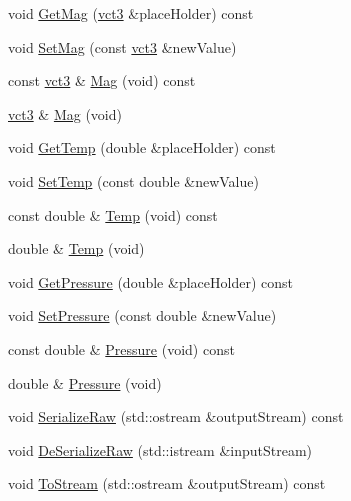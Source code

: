 \begin{DoxyCompactItemize}
\item 
void \hyperlink{classprm_i_m_u_sensors_a2b411076ee5ad07a1efc0579f155b439}{Get\+Mag} (\hyperlink{vct_fixed_size_vector_types_8h_a3af82acdbf4eeb73c551909240b106ea}{vct3} \&place\+Holder) const 
\item 
void \hyperlink{classprm_i_m_u_sensors_a32caeecddd4645cf66e262cb3616f471}{Set\+Mag} (const \hyperlink{vct_fixed_size_vector_types_8h_a3af82acdbf4eeb73c551909240b106ea}{vct3} \&new\+Value)
\item 
const \hyperlink{vct_fixed_size_vector_types_8h_a3af82acdbf4eeb73c551909240b106ea}{vct3} \& \hyperlink{classprm_i_m_u_sensors_a5953c853628f80037e25aa74cb838f6c}{Mag} (void) const 
\item 
\hyperlink{vct_fixed_size_vector_types_8h_a3af82acdbf4eeb73c551909240b106ea}{vct3} \& \hyperlink{classprm_i_m_u_sensors_ae8bd56f3961cd7474362fb7fe71bf3a1}{Mag} (void)
\item 
void \hyperlink{classprm_i_m_u_sensors_a5ad8f54818693ea340ed9588b78b4b2a}{Get\+Temp} (double \&place\+Holder) const 
\item 
void \hyperlink{classprm_i_m_u_sensors_a50d32b5dc243c0ebc92f74897fcc003b}{Set\+Temp} (const double \&new\+Value)
\item 
const double \& \hyperlink{classprm_i_m_u_sensors_acef6ba2cba7affc1c9a4ccc2b7a3f813}{Temp} (void) const 
\item 
double \& \hyperlink{classprm_i_m_u_sensors_a00f63260089ad1fc5816a27f10f401f6}{Temp} (void)
\item 
void \hyperlink{classprm_i_m_u_sensors_a0644e33374e81c6cbf58515799b5e9cf}{Get\+Pressure} (double \&place\+Holder) const 
\item 
void \hyperlink{classprm_i_m_u_sensors_a0e11b11d7c7401bc395517787da36a90}{Set\+Pressure} (const double \&new\+Value)
\item 
const double \& \hyperlink{classprm_i_m_u_sensors_a0c06f98ad9189f5bc3b95312212819c5}{Pressure} (void) const 
\item 
double \& \hyperlink{classprm_i_m_u_sensors_a4195e35726700ac110a0d267490f9d5f}{Pressure} (void)
\item 
void \hyperlink{classprm_i_m_u_sensors_a7fbac0911934e6ede0f6fea322ab0528}{Serialize\+Raw} (std\+::ostream \&output\+Stream) const 
\item 
void \hyperlink{classprm_i_m_u_sensors_afba3de04ddede05cd0d30645ef6c1804}{De\+Serialize\+Raw} (std\+::istream \&input\+Stream)
\item 
void \hyperlink{classprm_i_m_u_sensors_a89d31388a21cc708da3c09a7179a1012}{To\+Stream} (std\+::ostream \&output\+Stream) const 

\end{DoxyCompactItemize}

